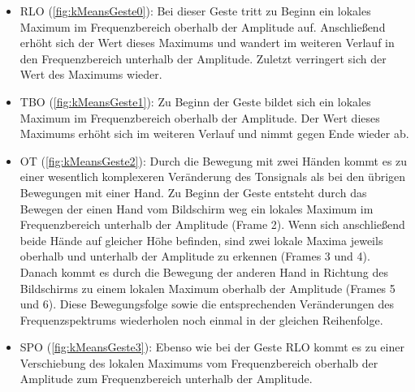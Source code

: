 \begin{itemize}
\item \ac{RLO} (\autoref{fig:kMeansGeste0}): Bei dieser Geste tritt zu Beginn ein lokales Maximum im Frequenzbereich oberhalb der Amplitude auf. Anschließend erhöht sich der Wert dieses Maximums und wandert im weiteren Verlauf in den Frequenzbereich unterhalb der Amplitude. Zuletzt verringert sich der Wert des Maximums wieder.

\item \ac{TBO} (\autoref{fig:kMeansGeste1}): Zu Beginn der Geste bildet sich ein lokales Maximum im Frequenzbereich oberhalb der Amplitude. Der Wert dieses Maximums erhöht sich im weiteren Verlauf und nimmt gegen Ende wieder ab.

\item \ac{OT} (\autoref{fig:kMeansGeste2}): Durch die Bewegung mit zwei Händen kommt es zu einer wesentlich komplexeren Veränderung des Tonsignals als bei den übrigen Bewegungen mit einer Hand. Zu Beginn der Geste entsteht durch das Bewegen der einen Hand vom Bildschirm weg ein lokales Maximum im Frequenzbereich unterhalb der Amplitude (Frame 2). Wenn sich anschließend beide Hände auf gleicher Höhe befinden, sind zwei lokale Maxima jeweils oberhalb und unterhalb der Amplitude zu erkennen (Frames 3 und 4). 
Danach kommt es durch die Bewegung der anderen Hand in Richtung des Bildschirms zu einem lokalen Maximum oberhalb der Amplitude (Frames 5 und 6).
Diese Bewegungsfolge sowie die entsprechenden Veränderungen des Frequenzspektrums wiederholen noch einmal in der gleichen Reihenfolge.

\item \ac{SPO} (\autoref{fig:kMeansGeste3}): Ebenso wie bei der Geste \ac{RLO} kommt es zu einer Verschiebung des lokalen Maximums vom Frequenzbereich oberhalb der Amplitude zum Frequenzbereich unterhalb der Amplitude.


\end{itemize}
